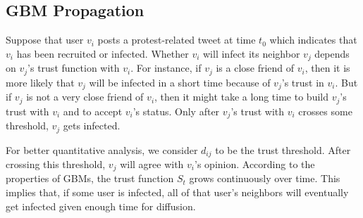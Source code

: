 

\subsection{GBM Propagation}
Suppose that user $v_i$ posts a protest-related tweet at time
$t_0$ which indicates that $v_i$ has been recruited or infected.
Whether $v_i$ will infect its neighbor $v_j$ depends on $v_j$'s trust function with $v_i$. For instance, if $v_j$ is a close friend of $v_i$, then it is more likely that $v_j$ will be infected in a short time because of $v_j$'s trust in $v_i$. But if $v_j$ is not a very close friend of $v_i$, then it might take a long time to build $v_j$'s trust with $v_i$ and to accept $v_i$'s status. Only after $v_j$'s trust with $v_i$ crosses some threshold, $v_j$ gets infected.

For better quantitative analysis, we consider $d_{ij}$ to be the trust threshold. After crossing this threshold, $v_j$ will agree with $v_i$'s opinion. According to the properties of GBMs, the trust function $S_t$ grows continuously over time. This implies that, if some user is infected, all of that user's neighbors will eventually get infected given enough time for diffusion.

